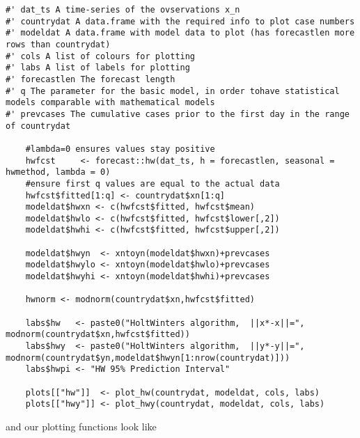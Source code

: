 \begin{lstlisting}[frame=single]
#' dat_ts A time-series of the ovservations x_n
#' countrydat A data.frame with the required info to plot case numbers
#' modeldat A data.frame with model data to plot (has forecastlen more rows than countrydat)
#' cols A list of colours for plotting
#' labs A list of labels for plotting
#' forecastlen The forecast length 
#' q The parameter for the basic model, in order tohave statistical models comparable with mathematical models
#' prevcases The cumulative cases prior to the first day in the range of countrydat

    #lambda=0 ensures values stay positive
    hwfcst     <- forecast::hw(dat_ts, h = forecastlen, seasonal = hwmethod, lambda = 0)
    #ensure first q values are equal to the actual data
    hwfcst$fitted[1:q] <- countrydat$xn[1:q]
    modeldat$hwxn <- c(hwfcst$fitted, hwfcst$mean)
    modeldat$hwlo <- c(hwfcst$fitted, hwfcst$lower[,2])
    modeldat$hwhi <- c(hwfcst$fitted, hwfcst$upper[,2])
    
    modeldat$hwyn  <- xntoyn(modeldat$hwxn)+prevcases
    modeldat$hwylo <- xntoyn(modeldat$hwlo)+prevcases
    modeldat$hwyhi <- xntoyn(modeldat$hwhi)+prevcases
    
    hwnorm <- modnorm(countrydat$xn,hwfcst$fitted)

    labs$hw   <- paste0("HoltWinters algorithm,  ||x*-x||=", modnorm(countrydat$xn,hwfcst$fitted))
    labs$hwy  <- paste0("HoltWinters algorithm,  ||y*-y||=", modnorm(countrydat$yn,modeldat$hwyn[1:nrow(countrydat)]))
    labs$hwpi <- "HW 95% Prediction Interval"
    
    plots[["hw"]]  <- plot_hw(countrydat, modeldat, cols, labs)
    plots[["hwy"]] <- plot_hwy(countrydat, modeldat, cols, labs)
\end{lstlisting}

and our plotting functions look like 

